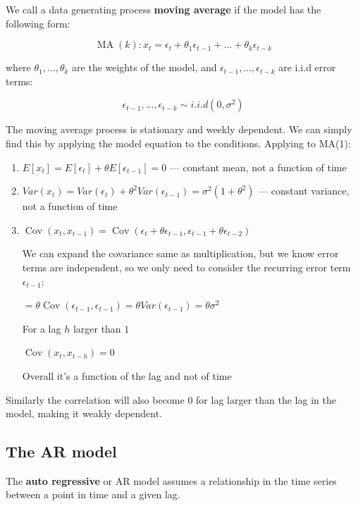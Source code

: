 We call a data generating process \textbf{moving average} if the model has the following form:

\[\operatorname{MA}(k): x_t = \epsilon_t + \theta_1\epsilon_{t-1}  + ... + \theta_k\epsilon_{t-k} \]

where \(\theta_1, ..., \theta_k\) are the weights of the model, and \(\epsilon_{t-1},...,\epsilon_{t-k}\) are i.i.d error terms:

\[\epsilon_{t-1},...,\epsilon_{t-k} \sim i.i.d(0, \sigma^2)\]

The moving average process is stationary and weekly dependent. We can simply find this by applying the model equation to the conditions. Applying to MA(1):

\begin{enumerate}
    \item \(E[x_t] = E[\epsilon_t] + \theta E[\epsilon_{t-1}] = 0\) — constant mean, not a function of time
    \item \(Var(x_t) = Var(\epsilon_t) + \theta^2 Var(\epsilon_{t-1}) = \sigma^2(1 + \theta^2)\) — constant variance, not a function of time
    \item \(\operatorname{Cov}(x_t, x_{t-1}) = \operatorname{Cov}(\epsilon_t + \theta\epsilon_{t-1}, \epsilon_{t-1} + \theta\epsilon_{t-2})\)

We can expand the covariance same as multiplication, but we know error terms are independent, so we only need to consider the recurring error term \(\epsilon_{t-1}\):

\(= \theta \operatorname{Cov}(\epsilon_{t-1}, \epsilon_{t-1}) = \theta Var(\epsilon_{t-1}) = \theta \sigma ^2\)

For a lag \(h\) larger than \(1\)

\(\operatorname{Cov}(x_t, x_{t-h}) = 0\)

Overall it's a function of the lag and not of time
\end{enumerate}

Similarly the correlation will also become \(0\) for lag larger than the lag in the model, making it weakly dependent.

\subsection{The AR model}

The \textbf{auto regressive} or AR model assumes a relationship in the time series between a point in time and a given lag.

